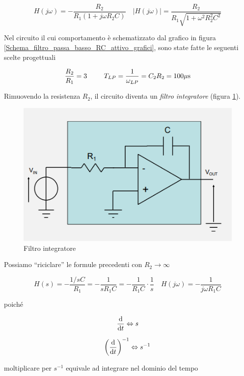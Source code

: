\documentclass{article}
\begin{document}
\[H(j \omega) = - \frac{R_2}{R_1 (1 + j \omega R_2 C)} \quad |H(j \omega)| = \frac{R_2}{R_1 \sqrt{1 + \omega ^2 R^2_2 C^2}}\]

Nel circuito il cui comportamento è schematizzato dal grafico in figura \ref{Schema_filtro_passa_basso_RC_attivo_grafici}, sono state fatte le seguenti scelte progettuali

\[\frac{R_2}{R_1} = 3 \;\;\;\;\;\;\;\;\;T_{LP} = \frac{1}{\omega _{LP}} = C_2 R_2 = 100 \mu \textrm s\]

\clearpage
Rimuovendo la resistenza $R_2$, il circuito diventa un \textit{filtro integratore} (figura \ref{Schema_filtro_integratore}).

\begin{figure}[h]
  \centering
  \includegraphics[scale=0.6]{IM_filtro_integratore}
  \caption{Filtro integratore}
  \label{Schema_filtro_integratore}
\end{figure}

Possiamo ``riciclare'' le formule precedenti con $R_2 \rightarrow \infty$

\[H(s) = - \frac{1/sC}{R_1} = - \frac{1}{sR_1 C} = - \frac{1}{R_1 C} \cdot \frac{1}{s} \quad H(j \omega) = - \frac{1}{j \omega R_1 C}\]

poiché

\[\frac{\textrm d}{\textrm d t} \Leftrightarrow s\]

\[\left( \frac{\textrm d}{\textrm d t} \right)^{-1} \Leftrightarrow s ^{-1}\]

moltiplicare per $s^{-1}$ equivale ad integrare nel dominio del tempo
\end{document}
